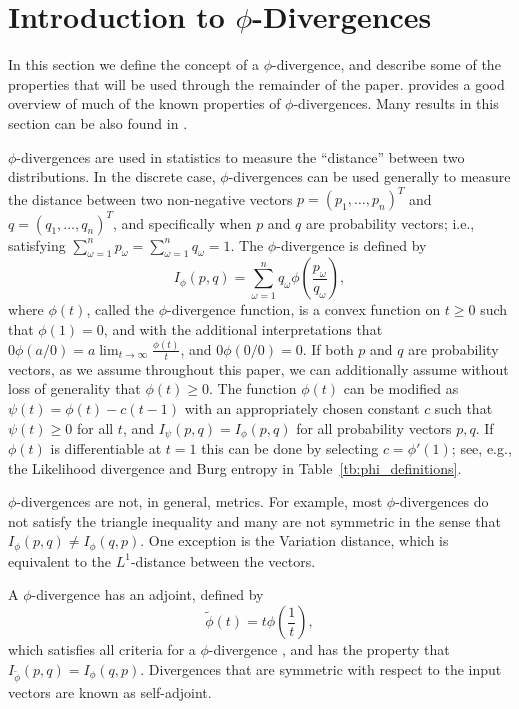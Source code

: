 \documentclass[ijoc,letterpaper]{informs3} %
\begin{document}
\section{Introduction to $\phi$-Divergences}
\label{sec:phi_divergences}

In this section we define the concept of a $\phi$-divergence, and describe some of the properties that will be used through the remainder of the paper.
\cite{pardo2005statistical} provides a good overview of much of the known properties of $\phi$-divergences.
Many results in this section can be also found in \citep{bental2011robust}.

$\phi$-divergences are used in statistics to measure the ``distance'' between two distributions. 
In the discrete case, $\phi$-divergences can be used generally to measure the distance between two non-negative vectors $p = (p_1, \dots, p_n)^T$ and $q = (q_1, \dots, q_n)^T$, and specifically when $p$ and $q$ are probability vectors; i.e., satisfying $\sum_{\omega=1}^n p_\omega = \sum_{\omega=1}^n q_\omega = 1$.
The $\phi$-divergence is defined by
\[
	I_\phi(p,q) = \sum_{\omega=1}^n q_\omega \phi\left(\frac{p_\omega}{q_\omega}\right),
\]
where $\phi(t)$, called the $\phi$-divergence function, is a convex function on $t \geq 0$ such that $\phi(1) = 0$, and with the additional interpretations that $0 \phi(a/0) = a \lim_{t \rightarrow \infty} \frac{\phi(t)}{t}$, and $0 \phi(0/0) = 0$.
If both $p$ and $q$ are probability vectors, as we assume throughout this paper, we can additionally assume without loss of generality that $\phi(t) \geq 0$.
The function $\phi(t)$ can be modified as $\psi(t) = \phi(t) - c(t-1)$ with an appropriately chosen constant $c$ such that $\psi(t) \geq 0$ for all $t$, and $I_\psi(p,q) = I_\phi(p,q)$ for all probability vectors $p,q$.
If $\phi(t)$ is differentiable at $t = 1$ this can be done by selecting $c = \phi'(1)$; see, e.g., the Likelihood divergence and Burg entropy in Table~\ref{tb:phi_definitions}.

$\phi$-divergences are not, in general, metrics.
For example, most $\phi$-divergences do not satisfy the triangle inequality and many are not symmetric in the sense that $I_\phi(p,q) \neq I_\phi(q,p)$.
One exception is the Variation distance, which is equivalent to the $L^1$-distance between the vectors.

A $\phi$-divergence has an adjoint, defined by
\begin{equation} \label{eq:adjoint}
	\tilde{\phi}(t) = t \phi\left(\frac{1}{t}\right),
\end{equation}
which satisfies all criteria for a $\phi$-divergence \citep{bental1991certainty}, and has the property that $I_{\tilde{\phi}}(p,q) = I_\phi(q,p)$.
Divergences that are symmetric with respect to the input vectors are known as self-adjoint.
\end{document}
